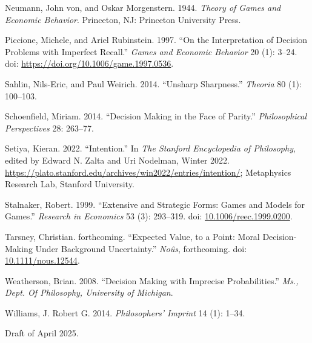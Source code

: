 \documentclass[
  11pt,
  letterpaper,
  DIV=11,
  numbers=noendperiod,
  twoside]{scrartcl}
\newlength{\cslhangindent}
\newenvironment{CSLReferences}[2] %
 {\begin{list}{}{%
  \setlength{\itemindent}{0pt}
  \setlength{\leftmargin}{0pt}
  \setlength{\parsep}{0pt}
  \ifodd #1
   \setlength{\leftmargin}{\cslhangindent}
   \setlength{\itemindent}{-1\cslhangindent}
  \fi
  \setlength{\itemsep}{#2\baselineskip}}}
 {\end{list}}
\begin{document}
\begin{CSLReferences}{1}{0}
Neumann, John von, and Oskar Morgenstern. 1944. \emph{Theory of Games
and Economic Behavior}. Princeton, NJ: Princeton University Press.

Piccione, Michele, and Ariel Rubinstein. 1997. {``On the Interpretation
of Decision Problems with Imperfect Recall.''} \emph{Games and Economic
Behavior} 20 (1): 3--24. doi:
\url{https://doi.org/10.1006/game.1997.0536}.

Sahlin, Nils-Eric, and Paul Weirich. 2014. {``Unsharp Sharpness.''}
\emph{Theoria} 80 (1): 100--103.

Schoenfield, Miriam. 2014. {``Decision Making in the Face of Parity.''}
\emph{Philosophical Perspectives} 28: 263--77.

Setiya, Kieran. 2022. {``{Intention}.''} In \emph{The {Stanford}
Encyclopedia of Philosophy}, edited by Edward N. Zalta and Uri Nodelman,
{W}inter 2022.
\url{https://plato.stanford.edu/archives/win2022/entries/intention/};
Metaphysics Research Lab, Stanford University.

Stalnaker, Robert. 1999. {``Extensive and Strategic Forms: Games and
Models for Games.''} \emph{Research in Economics} 53 (3): 293--319. doi:
\href{https://doi.org/10.1006/reec.1999.0200}{10.1006/reec.1999.0200}.

Tarsney, Christian. forthcoming. {``Expected Value, to a Point: Moral
Decision-Making Under Background Uncertainty.''} \emph{Noûs},
forthcoming. doi:
\href{https://doi.org/10.1111/nous.12544}{10.1111/nous.12544}.

Weatherson, Brian. 2008. {``Decision Making with Imprecise
Probabilities.''} \emph{Ms., Dept. Of Philosophy, University of
Michigan}.

Williams, J. Robert G. 2014. \emph{Philosophers' Imprint} 14 (1): 1--34.

\end{CSLReferences}



\noindent Draft of April 2025.
\end{document}
